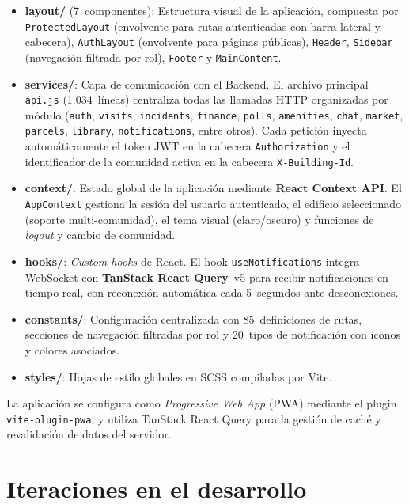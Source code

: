 \begin{itemize}
    \item \textbf{layout/} (7~componentes): Estructura visual de la aplicación, compuesta por \texttt{ProtectedLayout} (envolvente para rutas autenticadas con barra lateral y cabecera), \texttt{AuthLayout} (envolvente para páginas públicas), \texttt{Header}, \texttt{Sidebar} (navegación filtrada por rol), \texttt{Footer} y \texttt{MainContent}.

    \item \textbf{services/}: Capa de comunicación con el Backend. El archivo principal \texttt{api.js} (1.034~líneas) centraliza todas las llamadas HTTP organizadas por módulo (\texttt{auth}, \texttt{visits}, \texttt{incidents}, \texttt{finance}, \texttt{polls}, \texttt{amenities}, \texttt{chat}, \texttt{market}, \texttt{parcels}, \texttt{library}, \texttt{notifications}, entre otros). Cada petición inyecta automáticamente el token JWT en la cabecera \texttt{Authorization} y el identificador de la comunidad activa en la cabecera \texttt{X-Building-Id}.

    \item \textbf{context/}: Estado global de la aplicación mediante \textbf{React Context API}. El \texttt{AppContext} gestiona la sesión del usuario autenticado, el edificio seleccionado (soporte multi-comunidad), el tema visual (claro/oscuro) y funciones de \textit{logout} y cambio de comunidad.

    \item \textbf{hooks/}: \textit{Custom hooks} de React. El hook \texttt{useNotifications} integra WebSocket con \textbf{TanStack React Query}~v5 para recibir notificaciones en tiempo real, con reconexión automática cada 5~segundos ante desconexiones.

    \item \textbf{constants/}: Configuración centralizada con 85~definiciones de rutas, secciones de navegación filtradas por rol y 20~tipos de notificación con iconos y colores asociados.

    \item \textbf{styles/}: Hojas de estilo globales en SCSS compiladas por Vite.
\end{itemize}

La aplicación se configura como \textit{Progressive Web App} (PWA) mediante el plugin \texttt{vite-plugin-pwa}, y utiliza TanStack React Query para la gestión de caché y revalidación de datos del servidor.


\section{Iteraciones en el desarrollo}
\label{sec:iteraciones_desarrollo}


